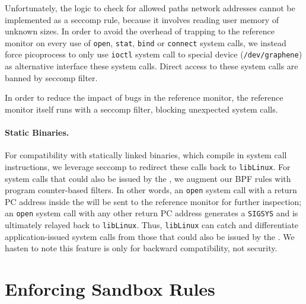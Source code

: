
Unfortunately, the logic to check for allowed paths network addresses cannot be implemented 
as a seccomp rule, because it involves reading user memory of unknown sizes. 
In order to avoid the overhead of trapping to the reference monitor on 
every use of {\tt open}, {\tt stat}, {\tt bind} or {\tt connect} system calls, we instead 
force picoprocess to only use {\tt ioctl} system call to \graphene{} special device ({\tt /dev/graphene}) as alternative interface these system calls. Direct access to these system calls are banned by seccomp filter.

In order to reduce the impact of bugs in the reference monitor,
the reference monitor itself runs with a seccomp filter,
blocking unexpected system calls.

\paragraph{Static Binaries.} 
For compatibility with statically linked binaries, which 
compile in system call instructions,
we leverage seccomp to redirect these calls 
back to {\tt libLinux}.  
For system calls that could also be issued by the \pal{},
we augment our BPF rules with program counter-based filters.
In other words, an {\tt open} system call with a return PC address inside the \pal{} 
will be sent to the reference monitor for further inspection;
an {\tt open} system call with any other return PC address generates 
a {\tt SIGSYS} and is ultimately relayed back to {\tt libLinux}.
Thus, {\tt libLinux} can catch and differentiate application-issued system calls
from those that could also be issued by the \pal{}.
We hasten to note this feature is only for backward compatibility,
not security. 


\section{Enforcing Sandbox Rules}



\begin{comment}
We hasten to note that program counter filtering
is only provided for backwards compatibility, not security.
An attacker can compromise the \pal{}, so system policies are enforced
externally by the reference monitor.


Dynamically redirecting system calls to {\tt libLinux} is 
less efficient than dynamically linking against
the \graphene{} libc or statically compiling {\tt libLinux} into the application.
The overhead of dynamic redirection comes from 
transferring control to the kernel, then back to 
the \pal{}, and then to {\tt libLinux}.
We leave exploration of more efficient alternatives for future work,
such as redirecting the hardware system call table to {\tt libLinux}
on a host system like Dune~\cite{belay12dune},
or dynamically rewriting parts of the static binary~\cite{hunt99detours}.
\end{comment}

